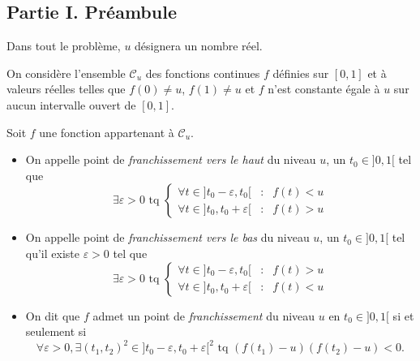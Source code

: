 \subsection*{Partie I. Pr{\'e}ambule}

Dans tout le probl{\`e}me, $u$ d{\'e}signera un nombre r{\'e}el.

On consid{\`e}re l'ensemble $\mathcal{C}_{u}$ des fonctions continues $f$ d{\'e}finies sur $[ 0,1] $ et {\`a} valeurs
r{\'e}elles telles que $f(0)\neq u$, $f(1)\neq u$ et $f$ n'est constante {\'e}gale {\`a} $u$ sur aucun intervalle ouvert de $[0,1] $.

Soit $f$ une fonction appartenant {\`a} $\mathcal{C}_{u}$.

\begin{itemize}
\item  On appelle point de \emph{franchissement vers le haut} du niveau $u$, un $t_{0} \in ] 0,1[$ tel que
\begin{displaymath}
  \exists \varepsilon > 0 \text{ tq }
  \left\lbrace
    \begin{align*}
      \forall t \in ] t_{0}-\varepsilon ,t_{0}[ &:& f(t)<u \\
      \forall t \in ] t_{0},t_{0}+\varepsilon [ &:& f(t)>u
    \end{align*}
 \right.
\end{displaymath}

\item  On appelle point de \emph{franchissement vers le bas} du niveau $u$, un $t_{0} \in ] 0,1[ $ tel qu'il existe $\varepsilon >0$ tel que
\begin{displaymath}
  \exists \varepsilon > 0 \text{ tq }
  \left\lbrace
    \begin{align*}
      \forall t \in ] t_{0}-\varepsilon ,t_{0}[ &:& f(t) > u \\
      \forall t \in ] t_{0},t_{0}+\varepsilon [ &:& f(t) < u
    \end{align*}
 \right.
\end{displaymath}

\item  On dit que $f$ admet un point de \emph{franchissement }du niveau $u$ en $t_{0}\in ] 0,1[ $ si et seulement si
\begin{displaymath}
 \forall \varepsilon >0, \exists (t_{1}, t_{2})^2 \in ] t_{0}-\varepsilon,t_{0}+\varepsilon [^2
 \text{ tq } (f(t_{1})-u)(f(t_{2})-u)<0.
\end{displaymath}

\end{itemize}

